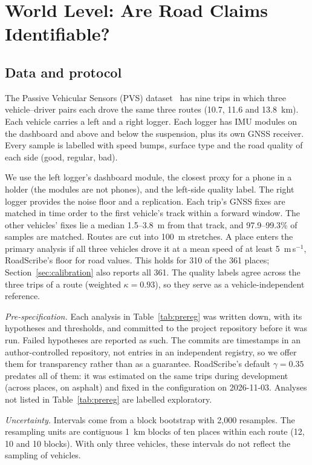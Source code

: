 \section{World Level: Are Road Claims Identifiable?}
\label{sec:world}

\subsection{Data and protocol}
\label{sec:data}
The Passive Vehicular Sensors (PVS) dataset~\cite{menegazzo2021pvs} has nine trips in which three vehicle--driver pairs each drove the same three routes (10.7, 11.6 and 13.8~km).
Each vehicle carries a left and a right logger. Each logger has IMU modules on the dashboard and above and below the suspension, plus its own GNSS receiver.
Every sample is labelled with speed bumps, surface type and the road quality of each side (good, regular, bad).

We use the left logger's dashboard module, the closest proxy for a phone in a holder (the modules are not phones), and the left-side quality label. The right logger provides the noise floor and a replication.
Each trip's GNSS fixes are matched in time order to the first vehicle's track within a forward window. The other vehicles' fixes lie a median 1.5--3.8~m from that track, and 97.9--99.3\% of samples are matched.
Routes are cut into 100~m stretches.
A place enters the primary analysis if all three vehicles drove it at a mean speed of at least 5~m\,s$^{-1}$, RoadScribe's floor for road values. This holds for 310 of the 361 places; Section~\ref{sec:calibration} also reports all 361.
The quality labels agree across the three trips of a route (weighted $\kappa=0.93$), so they serve as a vehicle-independent reference.

\emph{Pre-specification.}
Each analysis in Table~\ref{tab:prereg} was written down, with its hypotheses and thresholds, and committed to the project repository before it was run. Failed hypotheses are reported as such.
The commits are timestamps in an author-controlled repository, not entries in an independent registry, so we offer them for transparency rather than as a guarantee.
RoadScribe's default $\gamma=0.35$ predates all of them: it was estimated on the same trips during development (across places, on asphalt) and fixed in the configuration on 2026-11-03.
Analyses not listed in Table~\ref{tab:prereg} are labelled exploratory.

\emph{Uncertainty.}
Intervals come from a block bootstrap with 2{,}000 resamples. The resampling units are contiguous 1~km blocks of ten places within each route (12, 10 and 10 blocks).
With only three vehicles, these intervals do not reflect the sampling of vehicles.

